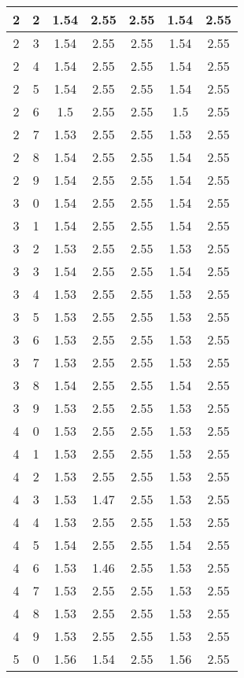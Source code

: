 \begin{longtable}{|c|c||c||c|c||c|c|}
	2 & 2 & 1.54 & 2.55 & 2.55 & 1.54 & 2.55 \\ \hline
	2 & 3 & 1.54 & 2.55 & 2.55 & 1.54 & 2.55 \\ \hline
	2 & 4 & 1.54 & 2.55 & 2.55 & 1.54 & 2.55 \\ \hline
	2 & 5 & 1.54 & 2.55 & 2.55 & 1.54 & 2.55 \\ \hline
	2 & 6 & 1.5 & 2.55 & 2.55 & 1.5 & 2.55 \\ \hline
	2 & 7 & 1.53 & 2.55 & 2.55 & 1.53 & 2.55 \\ \hline
	2 & 8 & 1.54 & 2.55 & 2.55 & 1.54 & 2.55 \\ \hline
	2 & 9 & 1.54 & 2.55 & 2.55 & 1.54 & 2.55 \\ \hline
	3 & 0 & 1.54 & 2.55 & 2.55 & 1.54 & 2.55 \\ \hline
	3 & 1 & 1.54 & 2.55 & 2.55 & 1.54 & 2.55 \\ \hline
	3 & 2 & 1.53 & 2.55 & 2.55 & 1.53 & 2.55 \\ \hline
	3 & 3 & 1.54 & 2.55 & 2.55 & 1.54 & 2.55 \\ \hline
	3 & 4 & 1.53 & 2.55 & 2.55 & 1.53 & 2.55 \\ \hline
	3 & 5 & 1.53 & 2.55 & 2.55 & 1.53 & 2.55 \\ \hline
	3 & 6 & 1.53 & 2.55 & 2.55 & 1.53 & 2.55 \\ \hline
	3 & 7 & 1.53 & 2.55 & 2.55 & 1.53 & 2.55 \\ \hline
	3 & 8 & 1.54 & 2.55 & 2.55 & 1.54 & 2.55 \\ \hline
	3 & 9 & 1.53 & 2.55 & 2.55 & 1.53 & 2.55 \\ \hline
	4 & 0 & 1.53 & 2.55 & 2.55 & 1.53 & 2.55 \\ \hline
	4 & 1 & 1.53 & 2.55 & 2.55 & 1.53 & 2.55 \\ \hline
	4 & 2 & 1.53 & 2.55 & 2.55 & 1.53 & 2.55 \\ \hline
	4 & 3 & 1.53 & 1.47 & 2.55 & 1.53 & 2.55 \\ \hline
	4 & 4 & 1.53 & 2.55 & 2.55 & 1.53 & 2.55 \\ \hline
	4 & 5 & 1.54 & 2.55 & 2.55 & 1.54 & 2.55 \\ \hline
	4 & 6 & 1.53 & 1.46 & 2.55 & 1.53 & 2.55 \\ \hline
	4 & 7 & 1.53 & 2.55 & 2.55 & 1.53 & 2.55 \\ \hline
	4 & 8 & 1.53 & 2.55 & 2.55 & 1.53 & 2.55 \\ \hline
	4 & 9 & 1.53 & 2.55 & 2.55 & 1.53 & 2.55 \\ \hline
	5 & 0 & 1.56 & 1.54 & 2.55 & 1.56 & 2.55 \\ \hline

\end{longtable}
